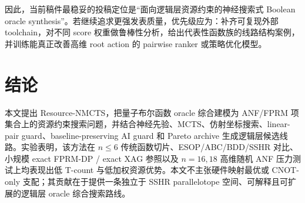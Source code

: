 \documentclass[UTF8,fontset=macnew,11pt]{ctexart}
\newcommand{\method}{Resource-NMCTS}
\begin{document}
因此，当前稿件最稳妥的投稿定位是“面向逻辑层资源约束的神经搜索式 Boolean oracle synthesis”。若继续追求更强发表质量，优先级应为：补齐可复现外部 toolchain，对不同 score 权重做鲁棒性分析，给出代表性函数族的线路结构案例，并训练能真正改善高维 root action 的 pairwise ranker 或策略优化模型。

\section{结论}

本文提出 \method{}，把量子布尔函数 oracle 综合建模为 ANF/FPRM 项集合上的资源约束搜索问题，并结合神经先验、MCTS、仿射坐标搜索、linear-pair guard、baseline-preserving AI guard 和 Pareto archive 生成逻辑层候选线路。实验表明，该方法在 $n\leq6$ 传统函数切片、ESOP/ABC/BDD/SSHR 对比、小规模 exact FPRM-DP / exact XAG 参照以及 $n=16,18$ 高维随机 ANF 压力测试上均表现出低 T-count 与低加权资源优势。本文不主张硬件映射最优或 CNOT-only 支配；其贡献在于提供一条独立于 SSHR parallelotope 空间、可解释且可扩展的逻辑层 oracle 综合搜索路线。
\end{document}
